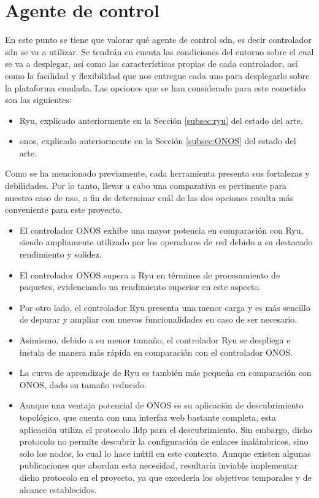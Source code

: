 \section{Agente de control }
\label{sec:ana_controller}

En este punto se tiene que valorar qué agente de control \gls{sdn}, es decir controlador \gls{sdn} se va a utilizar. Se tendrán en cuenta las condiciones del entorno sobre el cual se va a desplegar, así como las características propias de cada controlador, así como la facilidad y flexibilidad que nos entregue cada uno para desplegarlo sobre la plataforma emulada. Las opciones que se han considerado para este cometido son las siguientes:

\begin{itemize}
    \item Ryu, explicado anteriormente en la Sección \ref{subsec:ryu} del estado del arte.

    \item \gls{onos}, explicado anteriormente en la Sección \ref{subsec:ONOS} del estado del arte.
\end{itemize}

Como se ha mencionado previamente, cada herramienta presenta sus fortalezas y debilidades. Por lo tanto, llevar a cabo una comparativa es pertinente para nuestro caso de uso, a fin de determinar cuál de las dos opciones resulta más conveniente para este proyecto.

\begin{itemize}
    \item El controlador ONOS exhibe una mayor potencia en comparación con Ryu, siendo ampliamente utilizado por los operadores de red debido a su destacado rendimiento y solidez.
    \item El controlador ONOS supera a Ryu en términos de procesamiento de paquetes, evidenciando un rendimiento superior en este aspecto.
    \item Por otro lado, el controlador Ryu presenta una menor carga y es más sencillo de depurar y ampliar con nuevas funcionalidades en caso de ser necesario.
    \item Asimismo, debido a su menor tamaño, el controlador Ryu se despliega e instala de manera más rápida en comparación con el controlador ONOS.
    \item La curva de aprendizaje de Ryu es también más pequeña en comparación con ONOS, dado su tamaño reducido.
    \item Aunque una ventaja potencial de ONOS es su aplicación de descubrimiento topológico, que cuenta con una interfaz web bastante completa, esta aplicación utiliza el protocolo \gls{lldp} para el descubrimiento. Sin embargo, dicho protocolo no permite descubrir la configuración de enlaces inalámbricos, sino solo los nodos, lo cual lo hace inútil en este contexto. Aunque existen algunas publicaciones \cite{martinez2021ehddp} que abordan esta necesidad, resultaría inviable implementar dicho protocolo en el proyecto, ya que excedería los objetivos temporales y de alcance establecidos.
\end{itemize}


